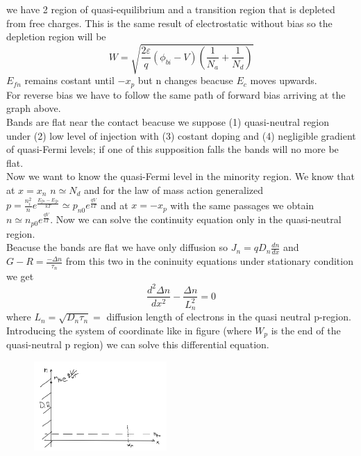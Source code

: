 we have 2 region of quasi-equilibrium and a transition region that is depleted from free charges. This is the same result of electrostatic without bias so the depletion region will be
\begin{equation}
W=\sqrt{\frac{2\varepsilon}{q}(\phi_{bi}-V)(\frac{1}{N_a}+\frac{1}{N_d})}
\end{equation}
$E_{fn}$ remains costant until $-x_p$ but n changes beacuse $E_c$ moves upwards.\\
For reverse bias we have to follow the same path of forward bias arriving at the graph above.\\
Bands are flat near the contact beacuse we suppose (1) quasi-neutral region under (2) low level of injection with (3) costant doping and (4) negligible gradient of quasi-Fermi levels; if one of this supposition falls the bands will no more be flat.\\
\vspace{5mm}
\label{cont.eq}
Now we want to know the quasi-Fermi level in the minority region.
We know that at $x=x_n$ $n\simeq N_d$ and for the law of mass action generalized $p=\frac{n_i^2}{n}e^{\frac{E_{fn}-E_{fp}}{kT}}\simeq p_{n0}e^{\frac{qV}{kT}}$ and at $x=-x_p$ with the same passages we obtain $n\simeq n_{p0}e^{\frac{qV}{kT}}$. Now we can solve the continuity equation only in the quasi-neutral region. \\
Beacuse the bands are flat we have only diffusion so $J_n=qD_n \frac{dn}{dx}$ and $G-R=\frac{-\Delta n}{\tau_n}$ from this two in the coninuity equations under stationary condition we get
\begin{equation}
\frac{d^2\Delta n}{dx^2}-\frac{\Delta n}{L_n^2}=0
\end{equation} 
where $L_n=\sqrt{D_n\tau_n}=$ diffusion length of electrons in the quasi neutral p-region. Introducing the system of coordinate like in figure (where $W_p$ is the end of the quasi-neutral p region) we can solve this differential equation.

\begin{figure}
\includegraphics[width=0.45\textwidth]{pn10.png}
\end{figure}

